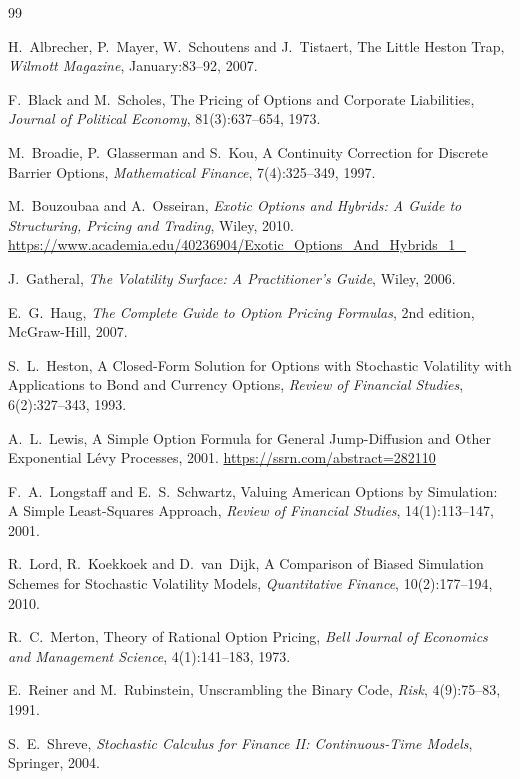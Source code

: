 \documentclass[11pt,a4paper]{article}
\theoremstyle{remark}
\begin{document}
\clearpage
\begin{thebibliography}{99}

H.~Albrecher, P.~Mayer, W.~Schoutens and J.~Tistaert,
The Little Heston Trap,
\emph{Wilmott Magazine}, January:83--92, 2007.

F.~Black and M.~Scholes,
The Pricing of Options and Corporate Liabilities,
\emph{Journal of Political Economy}, 81(3):637--654, 1973.

M.~Broadie, P.~Glasserman and S.~Kou,
A Continuity Correction for Discrete Barrier Options,
\emph{Mathematical Finance}, 7(4):325--349, 1997.

M.~Bouzoubaa and A.~Osseiran,
\emph{Exotic Options and Hybrids: A Guide to Structuring, Pricing and Trading},
Wiley, 2010.
\url{https://www.academia.edu/40236904/Exotic_Options_And_Hybrids_1_}

J.~Gatheral,
\emph{The Volatility Surface: A Practitioner's Guide},
Wiley, 2006.

E.~G.~Haug,
\emph{The Complete Guide to Option Pricing Formulas}, 2nd edition,
McGraw-Hill, 2007.

S.~L.~Heston,
A Closed-Form Solution for Options with Stochastic Volatility with
Applications to Bond and Currency Options,
\emph{Review of Financial Studies}, 6(2):327--343, 1993.

A.~L.~Lewis,
A Simple Option Formula for General Jump-Diffusion and Other Exponential
L\'evy Processes, 2001.
\url{https://ssrn.com/abstract=282110}

F.~A.~Longstaff and E.~S.~Schwartz,
Valuing American Options by Simulation: A Simple Least-Squares Approach,
\emph{Review of Financial Studies}, 14(1):113--147, 2001.

R.~Lord, R.~Koekkoek and D.~van~Dijk,
A Comparison of Biased Simulation Schemes for Stochastic Volatility Models,
\emph{Quantitative Finance}, 10(2):177--194, 2010.

R.~C.~Merton,
Theory of Rational Option Pricing,
\emph{Bell Journal of Economics and Management Science}, 4(1):141--183, 1973.

E.~Reiner and M.~Rubinstein,
Unscrambling the Binary Code,
\emph{Risk}, 4(9):75--83, 1991.

S.~E.~Shreve,
\emph{Stochastic Calculus for Finance II: Continuous-Time Models},
Springer, 2004.

\end{thebibliography}
\end{document}
